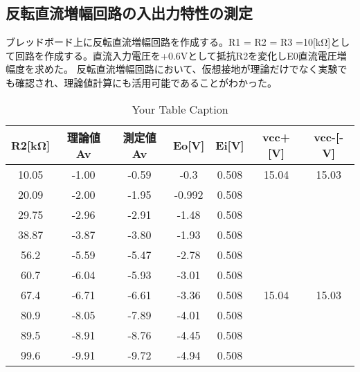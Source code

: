 \documentclass[a4paper,11pt,xelatex,ja=standard]{bxjsarticle}
\begin{document}
    \subsection{反転直流増幅回路の入出力特性の測定 }
        ブレッドボード上に反転直流増幅回路を作成する。R1 = R2 = R3 =10[kΩ]として回路を作成する。直流入力電圧を+0.6Vとして抵抗R2を変化しE0直流電圧増幅度を求めた。
        反転直流増幅回路において、仮想接地が理論だけでなく実験でも確認され、理論値計算にも活用可能であることがわかった。
        \begin{table}[htbp]
            \centering
            \caption{Your Table Caption}
            \label{tab:my-table}
            \begin{tabular}{|c|c|c|c|c|c|c|}
            \hline
            \textbf{R2[kΩ]} & \textbf{理論値Av} & \textbf{測定値Av} & \textbf{Eo[V]} & \textbf{Ei[V]} & \textbf{vcc+[V]} & \textbf{vcc-[-V]} \\ \hline
            10.05           & -1.00             & -0.59            & -0.3            & 0.508           & 15.04             & 15.03             \\ \hline
            20.09           & -2.00             & -1.95            & -0.992          & 0.508           &                   &                   \\ \hline
            29.75           & -2.96             & -2.91            & -1.48           & 0.508           &                   &                   \\ \hline
            38.87           & -3.87             & -3.80            & -1.93           & 0.508           &                   &                   \\ \hline
            56.2            & -5.59             & -5.47            & -2.78           & 0.508           &                   &                   \\ \hline
            60.7            & -6.04             & -5.93            & -3.01           & 0.508           &                   &                   \\ \hline
            67.4            & -6.71             & -6.61            & -3.36           & 0.508           & 15.04             & 15.03             \\ \hline
            80.9            & -8.05             & -7.89            & -4.01           & 0.508           &                   &                   \\ \hline
            89.5            & -8.91             & -8.76            & -4.45           & 0.508           &                   &                   \\ \hline
            99.6            & -9.91             & -9.72            & -4.94           & 0.508           &                   &                   \\ \hline
            \end{tabular}
            \end{table}
            
\end{document}

